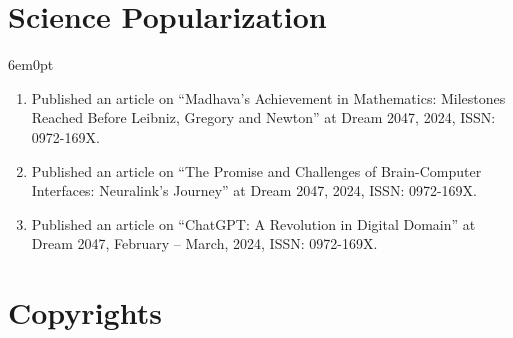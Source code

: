 \documentclass[11pt,a4paper]{moderncv}
\begin{document}
\section{\textbf{Science Popularization}}

\begin{adjustwidth}{6em}{0pt}
	\begin{enumerate}
		
		\item Published an article on “Madhava’s Achievement in Mathematics: Milestones Reached Before Leibniz, Gregory and Newton” at Dream 2047, 2024, ISSN: 0972-169X.
		
		\item Published an article on “The Promise and Challenges of Brain-Computer Interfaces: Neuralink’s Journey” at Dream 2047, 2024, ISSN: 0972-169X.
		
		\item Published an article on “ChatGPT: A Revolution in Digital Domain” at Dream 2047, February – March, 2024, ISSN: 0972-169X.
		
	\end{enumerate}
\end{adjustwidth}





\section{\textbf{Copyrights}}
\end{document}
